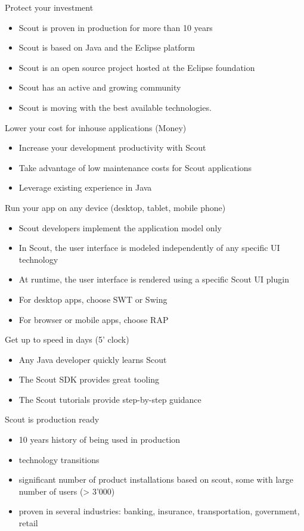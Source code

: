 \documentclass[a4paper,10pt,twoside]{book}
\begin{document}
Protect your investment
\begin{itemize}
  \item Scout is proven in production for more than 10 years
  \item Scout is based on Java and the Eclipse platform
  \item Scout is an open source project hosted at the Eclipse foundation
  \item Scout has an active and growing community
  \item Scout is moving with the best available technologies.

\end{itemize}

Lower your cost for inhouse applications (Money)
\begin{itemize}
  \item Increase your development productivity with Scout
  \item Take advantage of low maintenance costs for Scout applications
  \item Leverage existing experience in Java
\end{itemize}

Run your app on any device (desktop, tablet, mobile phone)
\begin{itemize}
  \item Scout developers implement the application model only
  \item In Scout, the user interface is modeled independently of any specific UI technology
  \item At runtime, the user interface is rendered using a specific Scout UI plugin
  \item For desktop apps, choose SWT or Swing
  \item For browser or mobile apps, choose RAP
\end{itemize}

Get up to speed in days (5' clock)
\begin{itemize}
  \item Any Java developer quickly learns Scout
  \item The Scout SDK provides great tooling
  \item The Scout tutorials provide step-by-step guidance
\end{itemize}

Scout is production ready
\begin{itemize}
  \item 10 years history of being used in production
  \item technology transitions
  \item significant number of product installations based on scout, some with large number of users (> 3'000)
  \item proven in several industries: banking, insurance, transportation, government, retail
\end{itemize}
\end{document}
